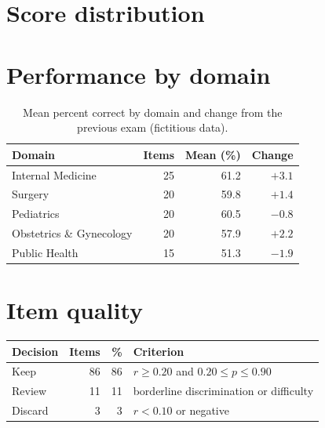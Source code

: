 \documentclass[11pt,a4paper]{article}
\begin{document}
\section{Score distribution}

\begin{center}
\end{center}

\section{Performance by domain}

\begin{table}[h]
\centering
\begin{tabularx}{0.85\linewidth}{X r r r}
\toprule
\textbf{Domain} & \textbf{Items} & \textbf{Mean (\%)} & \textbf{Change} \\
\midrule
Internal Medicine        & 25 & 61.2 & \textcolor{success}{$+3.1$} \\
Surgery                  & 20 & 59.8 & \textcolor{success}{$+1.4$} \\
Pediatrics               & 20 & 60.5 & \textcolor{danger}{$-0.8$} \\
Obstetrics \& Gynecology & 20 & 57.9 & \textcolor{success}{$+2.2$} \\
Public Health            & 15 & 51.3 & \textcolor{danger}{$-1.9$} \\
\bottomrule
\end{tabularx}
\caption{Mean percent correct by domain and change from the previous exam (fictitious data).}
\end{table}

\section{Item quality}

\begin{table}[h]
\centering
\begin{tabular}{l r r l}
\toprule
\textbf{Decision} & \textbf{Items} & \textbf{\%} & \textbf{Criterion} \\
\midrule
Keep    & 86 & 86 & $r \ge 0.20$ and $0.20 \le p \le 0.90$ \\
Review  & 11 & 11 & borderline discrimination or difficulty \\
Discard &  3 &  3 & $r < 0.10$ or negative \\
\bottomrule
\end{tabular}
\end{table}
\end{document}
